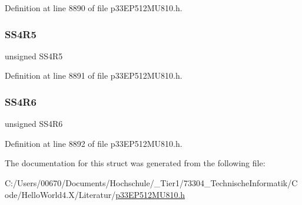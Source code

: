 Definition at line 8890 of file p33\+E\+P512\+M\+U810.\+h.

\mbox{\label{structtag_r_p_i_n_r32_b_i_t_s_ab59b506d3bc96fb45a607a8a4c49a059}} 
\subsubsection{\texorpdfstring{S\+S4\+R5}{SS4R5}}
{\footnotesize\ttfamily unsigned S\+S4\+R5}



Definition at line 8891 of file p33\+E\+P512\+M\+U810.\+h.

\mbox{\label{structtag_r_p_i_n_r32_b_i_t_s_a0921e6a113f9eaf676ee2395465d629a}} 
\subsubsection{\texorpdfstring{S\+S4\+R6}{SS4R6}}
{\footnotesize\ttfamily unsigned S\+S4\+R6}



Definition at line 8892 of file p33\+E\+P512\+M\+U810.\+h.



The documentation for this struct was generated from the following file\+:\begin{DoxyCompactItemize}
\item 
C\+:/\+Users/00670/\+Documents/\+Hochschule/\+\_\+\+Tier1/73304\+\_\+\+Technische\+Informatik/\+Code/\+Hello\+World4.\+X/\+Literatur/\hyperlink{p33_e_p512_m_u810_8h}{p33\+E\+P512\+M\+U810.\+h}\end{DoxyCompactItemize}

